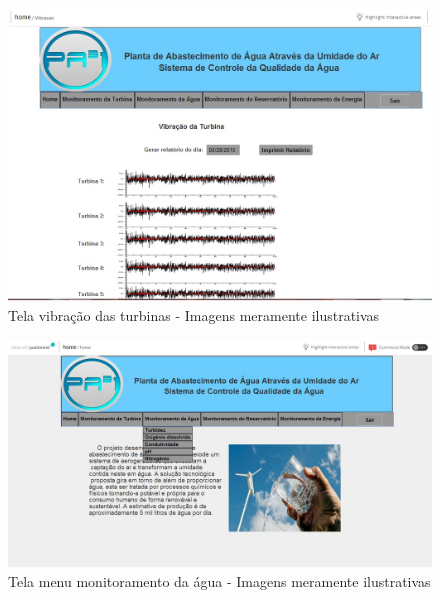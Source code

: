 \begin{center}
\begin{figure}[!ht]
\centering
\includegraphics[scale=0.5]{figuras/5}
\caption[Tela vibração das turbinas]{Tela vibração das turbinas - Imagens meramente ilustrativas}
\label{tela_vibracao_das_turbinas}
\end{figure}
\clearpage

\begin{figure}[!ht]
\centering
\includegraphics[scale=0.5]{figuras/menu_monitoramento_da_agua}
\caption[Tela menu monitoramento da água]{Tela menu monitoramento da água - Imagens meramente ilustrativas}
\label{menu_monitoramento_da_agua}
\end{figure}
\clearpage


\end{center}
